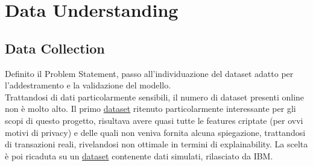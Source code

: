 \documentclass[]{article}
\begin{document}
\section{Data Understanding}
    \subsection{Data Collection}
        Definito il Problem Statement, passo all'individuazione del dataset adatto per l'addestramento e la validazione del modello.\\
        Trattandosi di dati particolarmente sensibili, il numero di dataset presenti online non è molto alto. Il primo \href{https://www.kaggle.com/datasets/mlg-ulb/creditcardfraud}{dataset} ritenuto particolarmente interessante per gli scopi di questo progetto, risultava avere quasi tutte le features criptate (per ovvi motivi di privacy) e delle quali non veniva fornita alcuna spiegazione, trattandosi di transazioni reali, rivelandosi non ottimale in termini di explainability.
        La scelta è poi ricaduta su un \href{https://www.kaggle.com/datasets/ealtman2019/credit-card-transactions/data}{dataset} contenente dati simulati, rilasciato da IBM.
\end{document}
